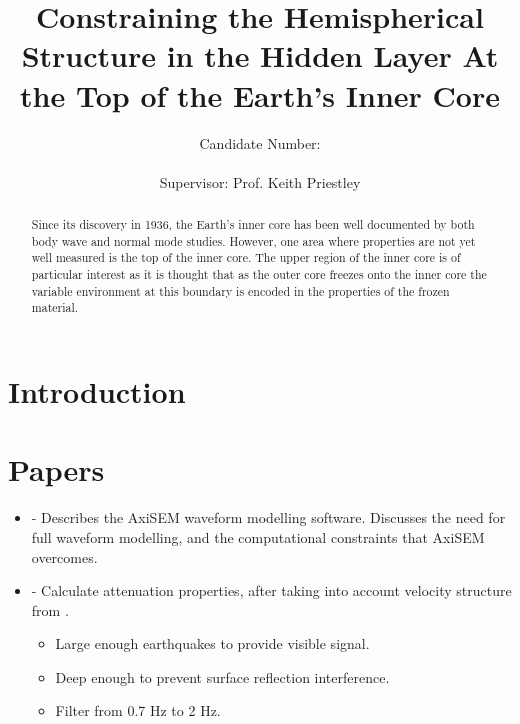 \documentclass[11pt,a4paper]{article}
\begin{document}
\title{Constraining the Hemispherical Structure in the Hidden Layer At the Top of the Earth's Inner Core}
\author{Candidate Number: \\  \\ Supervisor: Prof. Keith Priestley}
\maketitle

\begin{abstract}
Since its discovery in 1936, the Earth's inner core has been well documented by both body wave and normal mode studies. However, one area where properties are not yet well measured is the top of the inner core. The upper region of the inner core is of particular interest as it is thought that as the outer core freezes onto the inner core the variable environment at this boundary is encoded in the properties of the frozen material. 
\end{abstract}

\newpage
\section{Introduction}



\section{Papers}
\begin{itemize}
	\item \cite{Nissen-Meyer2014} - Describes the AxiSEM waveform modelling software. Discusses the need for full waveform modelling, and the computational constraints that AxiSEM overcomes.

	\item \cite{Waszek2013a} - Calculate attenuation properties, after taking into account velocity structure from \cite{Waszek2011a}.
\begin{itemize}
	\item Large enough earthquakes to provide visible signal.
	\item Deep enough to prevent surface reflection interference.
	\item Filter from 0.7 Hz to 2 Hz.
\end{itemize}

\end{itemize}


\end{document}

